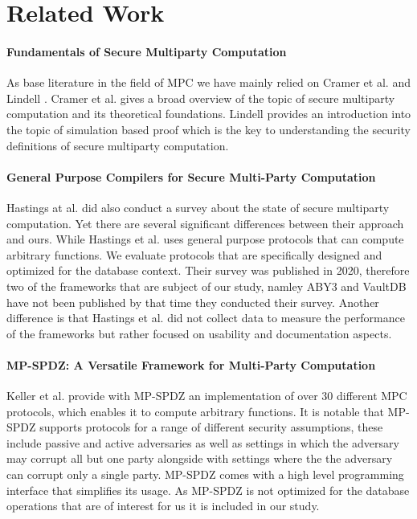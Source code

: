 \section {Related Work}
\paragraph{Fundamentals of Secure Multiparty Computation}
As base literature in the field of MPC we have mainly relied on Cramer et al.\cite{cramer2005multiparty} and Lindell \cite{lindell2017simulate}. Cramer et al. gives a broad overview of the topic of secure multiparty computation and its theoretical foundations. Lindell provides an introduction into the topic of simulation based proof which is the key to understanding the security definitions of secure multiparty computation.



\paragraph{ General Purpose Compilers for Secure Multi-Party Computation}
Hastings at al. \cite{hastings2019sok} did also conduct a survey about the state of secure multiparty computation. Yet there are several significant differences between their approach and ours. While Hastings et al. uses general purpose protocols that can compute arbitrary functions.  We evaluate protocols that are specifically designed and optimized for the database context. Their survey was published in 2020, therefore two of the frameworks that are subject of our study, namley ABY3 and VaultDB have not been published by that time they conducted their survey. Another difference is that Hastings et al. did not collect data to measure the performance of the frameworks but rather focused on usability and documentation aspects.

\paragraph{MP-SPDZ: A Versatile Framework for Multi-Party Computation}
Keller et al. \cite{hastings2019sok} provide with MP-SPDZ an implementation of over 30 different MPC protocols, which enables it  to compute arbitrary functions. It is notable that MP-SPDZ supports protocols for a range of different security assumptions, these include passive and active adversaries as well as settings in which the adversary may corrupt all but one party alongside with settings where the the adversary can corrupt only a single party. MP-SPDZ comes with a high level programming interface that simplifies its usage. As MP-SPDZ is not optimized for the database operations that are of interest for us it is included in our study. 